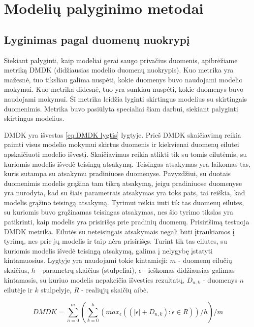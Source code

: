 \documentclass{VUMIFInfBakalaurinis}
\begin{document}
\section{Modelių palyginimo metodai}

\subsection{Lyginimas pagal duomenų nuokrypį}

\par Siekiant palyginti, kaip modeliai gerai saugo privačius duomenis, apibrėžiame metriką DMDK (didžiausias modelio duomenų nuokrypis). Kuo metrika yra mažesnė, tuo tiksliau galima nuspėti, kokie duomenys buvo naudojami modelio mokymui. Kuo metrika didesnė, tuo yra sunkiau nuspėti, kokie duomenys buvo naudojami mokymui. Ši metrika leidžia lyginti skirtingus modelius su skirtingais duomenimis. Metrika buvo pasiūlyta specialiai šiam darbui, siekiant palyginti skirtingus modelius.
\par DMDK yra išvestas \eqref{eq:DMDK lygtis} lygtyje. Prieš DMDK skaičiavimą reikia paimti visus modelio mokymui skirtus duomenis ir kiekvienai duomenų eilutei apskaičiuoti modelio išvestį. Skaičiavimus reikia atlikti tik su tomis eilutėmis, su kuriomis modelis išvedė teisingą atsakymą. Teisingas atsakymas yra laikomas tas, kuris sutampa su atsakymu pradiniuose duomenyse. Pavyzdžiui, su duotais duomenimis modelis grąžina tam tikrą atsakymą, jeigu pradiniuose duomenyse yra nurodyta, kad su šiais parametrais atsakymas yra toks pats, tai reiškia, kad modelis grąžino teisingą atsakymą. Tyrimui reikia imti tik tas duomenų eilutes, su kuriomis buvo grąžinamas teisingas atsakymas, nes šio tyrimo tikslas yra patikrinti, kaip modelis yra prisirišęs prie pradinių duomenų. Prisirišimą testuoja DMDK metrika. Eilutės su neteisingais atsakymais negali būti įtraukiamos į tyrimą, nes prie jų modelis ir taip nėra prisirišęs. Turint tik tas eilutes, su kuriomis modelis išvedė teisingą atsakymą, galima į nelygybę įstatyti kintamuosius. Lygtyje yra naudojami tokie kintamieji: $m$ - duomenų eilučių skaičius, $h$ - parametrų skaičius (stulpeliai), $\epsilon$ - ieškomas didžiausias galimas kintamasis, su kuriuo modelis nepakeičia išvesties rezultatų, $D_{n, k}$ - duomenys $n$ eilutėje ir $k$ stulpelyje, $R$ - realiųjų skaičių aibė.

\begin{equation}
DMDK = {\sum_{n=0}^{m} ({\sum_{k=0}^{h} (max_{\epsilon}((|\epsilon| + D_{n, k}) : \epsilon \in R))}/{h})}/{m}
\label{eq:DMDK lygtis}
\end{equation} 
\end{document}
